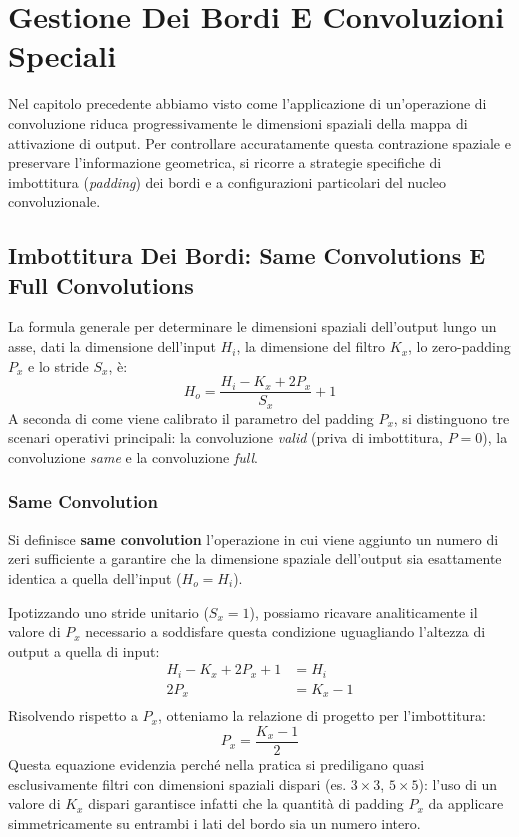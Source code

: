 ﻿\documentclass[11pt, a4paper]{article}
\begin{document}
\section{Gestione Dei Bordi E Convoluzioni Speciali}

Nel capitolo precedente abbiamo visto come l'applicazione di un'operazione di convoluzione riduca progressivamente le dimensioni spaziali della mappa di attivazione di output. Per controllare accuratamente questa contrazione spaziale e preservare l'informazione geometrica, si ricorre a strategie specifiche di imbottitura (\emph{padding}) dei bordi e a configurazioni particolari del nucleo convoluzionale.

\subsection{Imbottitura Dei Bordi: Same Convolutions E Full Convolutions}

La formula generale per determinare le dimensioni spaziali dell'output lungo un asse, dati la dimensione dell'input $H_i$, la dimensione del filtro $K_x$, lo zero-padding $P_x$ e lo stride $S_x$, è:
\[
H_o = \frac{H_i - K_x + 2P_x}{S_x} + 1
\]
A seconda di come viene calibrato il parametro del padding $P_x$, si distinguono tre scenari operativi principali: la convoluzione \emph{valid} (priva di imbottitura, $P = 0$), la convoluzione \emph{same} e la convoluzione \emph{full}.

\subsubsection{Same Convolution}
Si definisce \textbf{same convolution} l'operazione in cui viene aggiunto un numero di zeri sufficiente a garantire che la dimensione spaziale dell'output sia esattamente identica a quella dell'input ($H_o = H_i$).

Ipotizzando uno stride unitario ($S_x = 1$), possiamo ricavare analiticamente il valore di $P_x$ necessario a soddisfare questa condizione uguagliando l'altezza di output a quella di input:
\begin{align*}
H_i - K_x + 2P_x + 1 &= H_i \\
2P_x &= K_x - 1 \\
\end{align*}
Risolvendo rispetto a $P_x$, otteniamo la relazione di progetto per l'imbottitura:
\[
\boxed{P_x = \frac{K_x - 1}{2}}
\]
Questa equazione evidenzia perché nella pratica si prediligano quasi esclusivamente filtri con dimensioni spaziali dispari (es. $3 \times 3$, $5 \times 5$): l'uso di un valore di $K_x$ dispari garantisce infatti che la quantità di padding $P_x$ da applicare simmetricamente su entrambi i lati del bordo sia un numero intero.
\end{document}
